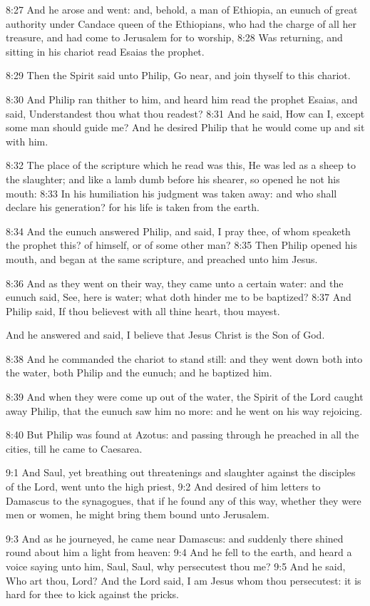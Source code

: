 8:27 And he arose and went: and, behold, a man of Ethiopia, an eunuch
of great authority under Candace queen of the Ethiopians, who had the
charge of all her treasure, and had come to Jerusalem for to worship,
8:28 Was returning, and sitting in his chariot read Esaias the
prophet.

8:29 Then the Spirit said unto Philip, Go near, and join thyself to
this chariot.

8:30 And Philip ran thither to him, and heard him read the prophet
Esaias, and said, Understandest thou what thou readest?  8:31 And he
said, How can I, except some man should guide me? And he desired
Philip that he would come up and sit with him.

8:32 The place of the scripture which he read was this, He was led as
a sheep to the slaughter; and like a lamb dumb before his shearer, so
opened he not his mouth: 8:33 In his humiliation his judgment was
taken away: and who shall declare his generation? for his life is
taken from the earth.

8:34 And the eunuch answered Philip, and said, I pray thee, of whom
speaketh the prophet this? of himself, or of some other man?  8:35
Then Philip opened his mouth, and began at the same scripture, and
preached unto him Jesus.

8:36 And as they went on their way, they came unto a certain water:
and the eunuch said, See, here is water; what doth hinder me to be
baptized?  8:37 And Philip said, If thou believest with all thine
heart, thou mayest.

And he answered and said, I believe that Jesus Christ is the Son of
God.

8:38 And he commanded the chariot to stand still: and they went down
both into the water, both Philip and the eunuch; and he baptized him.

8:39 And when they were come up out of the water, the Spirit of the
Lord caught away Philip, that the eunuch saw him no more: and he went
on his way rejoicing.

8:40 But Philip was found at Azotus: and passing through he preached
in all the cities, till he came to Caesarea.

9:1 And Saul, yet breathing out threatenings and slaughter against the
disciples of the Lord, went unto the high priest, 9:2 And desired of
him letters to Damascus to the synagogues, that if he found any of
this way, whether they were men or women, he might bring them bound
unto Jerusalem.

9:3 And as he journeyed, he came near Damascus: and suddenly there
shined round about him a light from heaven: 9:4 And he fell to the
earth, and heard a voice saying unto him, Saul, Saul, why persecutest
thou me?  9:5 And he said, Who art thou, Lord? And the Lord said, I am
Jesus whom thou persecutest: it is hard for thee to kick against the
pricks.

